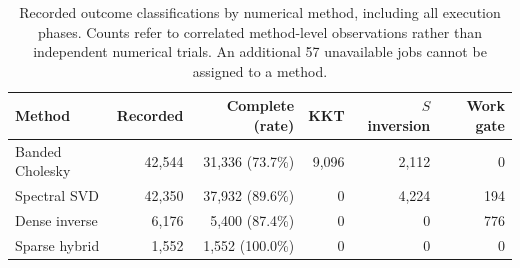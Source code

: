 \begin{table}[t]
\caption{Recorded outcome classifications by numerical method, including all execution phases. Counts refer to correlated method-level observations rather than independent numerical trials. An additional 57 unavailable jobs cannot be assigned to a method.}
\label{tab:empirical-reliability}
\centering\scriptsize\setlength{\tabcolsep}{3.5pt}
\begin{tabular}{lrrrrr}
\toprule
Method & Recorded & Complete (rate) & KKT & $S$ inversion & Work gate\\
\midrule
Banded Cholesky & 42,544 & 31,336 (73.7\%) & 9,096 & 2,112 & 0\\
Spectral SVD & 42,350 & 37,932 (89.6\%) & 0 & 4,224 & 194\\
Dense inverse & 6,176 & 5,400 (87.4\%) & 0 & 0 & 776\\
Sparse hybrid & 1,552 & 1,552 (100.0\%) & 0 & 0 & 0\\
\bottomrule
\end{tabular}
\end{table}
